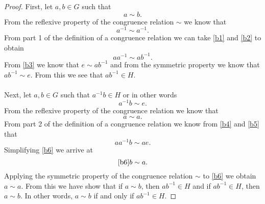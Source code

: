\documentclass[11pt,a4paper]{article}
\begin{document}
\begin{proof}
First, let $a,b\in G$ such that 
\begin{equation}\label{b1}
a \sim b.
\end{equation}
From the reflexive property of the congruence relation $\sim$ we know that 
\begin{equation}\label{b2}
a ^{-1}\sim a^{-1}.
\end{equation}
From part 1 of the definition of a congruence relation we can take \eqref{b1} and \eqref{b2} to obtain
\begin{equation}\label{b3}
aa^{-1} \sim ab^{-1}.
\end{equation}
From \eqref{b3} we know that $e \sim ab^{-1}$ and from the symmetric property we know that $ab^{-1} \sim e$. From this we see that $ab^{-1}\in H$.\\
~\\
Next, let $a,b\in G$ such that $a^{-1}b \in H$ or in other words
\begin{equation}\label{b4}
a^{-1}b \sim e.
\end{equation}
From the reflexive property of the congruence relation we know that 
\begin{equation}\label{b5}
a \sim a.
\end{equation}
From part 2 of the definition of a congruence relation we know from \eqref{b4} and \eqref{b5} that
\begin{equation}\label{b6}
aa^{-1}b \sim ae.
\end{equation}
Simplifying \eqref{b6} we arrive at
\begin{equation}\eqref{b6}
b \sim a.
\end{equation}
Applying the symmetric property of the congruence relation $\sim$ to \eqref{b6} we obtain
$a \sim a.$ From this we have show that if $a\sim b$, then $ab^{-1} \in H$ and if $ab^{-1} \in H$, then $a\sim b$. In other words, $a\sim b$ if and only if $ab^{-1} \in H$.
\end{proof}
\end{document}
